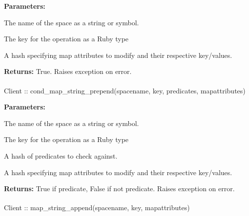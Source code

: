 \noindent\textbf{Parameters:}
\begin{description}[labelindent=\widthof{{\code{mapattributes}}},leftmargin=*,noitemsep,nolistsep,align=right]
\item[\code{spacename}] The name of the space as a string or symbol.
\item[\code{key}] The key for the operation as a Ruby type
\item[\code{mapattributes}] A hash specifying map attributes to modify and their respective key/values.
\end{description}

\noindent\textbf{Returns:}
True.  Raises exception on error.

\paragraph{}
\begin{ccode}
Client :: cond_map_string_prepend(spacename, key, predicates, mapattributes)
\end{ccode}
\funcdesc 

\noindent\textbf{Parameters:}
\begin{description}[labelindent=\widthof{{\code{mapattributes}}},leftmargin=*,noitemsep,nolistsep,align=right]
\item[\code{spacename}] The name of the space as a string or symbol.
\item[\code{key}] The key for the operation as a Ruby type
\item[\code{predicates}] A hash of predicates to check against.
\item[\code{mapattributes}] A hash specifying map attributes to modify and their respective key/values.
\end{description}

\noindent\textbf{Returns:}
True if predicate, False if not predicate.  Raises exception on error.

\paragraph{}
\begin{ccode}
Client :: map_string_append(spacename, key, mapattributes)
\end{ccode}
\funcdesc 

